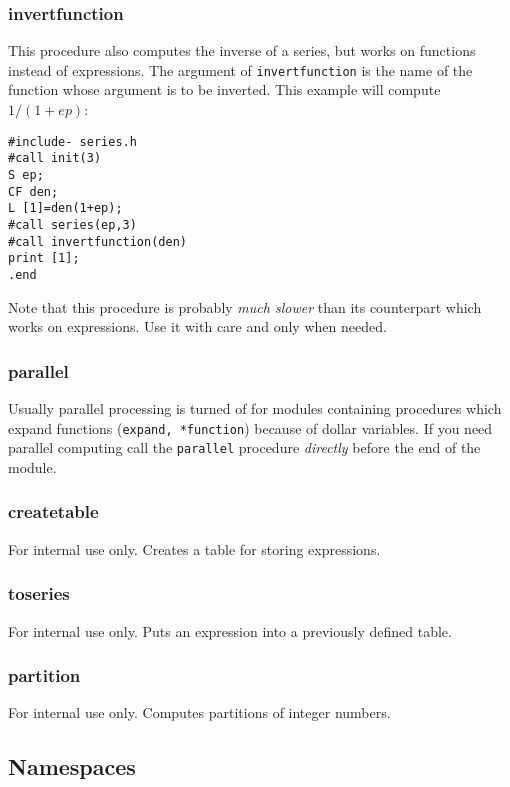 \documentclass{article}
\begin{document}
\subsubsection{invertfunction}
\label{sec:inv_fun}

This procedure also computes the inverse of a series, but works on
functions instead of expressions. The argument of {\tt invertfunction} is
the name of the function whose argument is to be inverted. This example will compute $1/(1+ep)$:
\begin{verbatim}
#include- series.h
#call init(3)
S ep;
CF den;
L [1]=den(1+ep);
#call series(ep,3)
#call invertfunction(den)
print [1];
.end
\end{verbatim}
Note that this procedure is probably {\it much slower} than its
counterpart which works on expressions. Use it with care and only when needed.

\subsubsection{parallel}
\label{sec:parallel}

Usually parallel processing is turned of for modules containing
procedures which expand functions ({\tt expand, *function}) because of
dollar variables. If you need
parallel computing call the {\tt parallel} procedure {\em directly}
  before the end of the module.

\subsubsection{createtable}
\label{sec:createtable}

For internal use only. Creates a table for storing expressions.

\subsubsection{toseries}
\label{sec:toseries}

For internal use only. Puts an expression into a previously defined table.

\subsubsection{partition}
\label{sec:toseries}

For internal use only. Computes partitions of integer numbers.

\subsection{Namespaces}
\label{sec:namesp}
\end{document}
